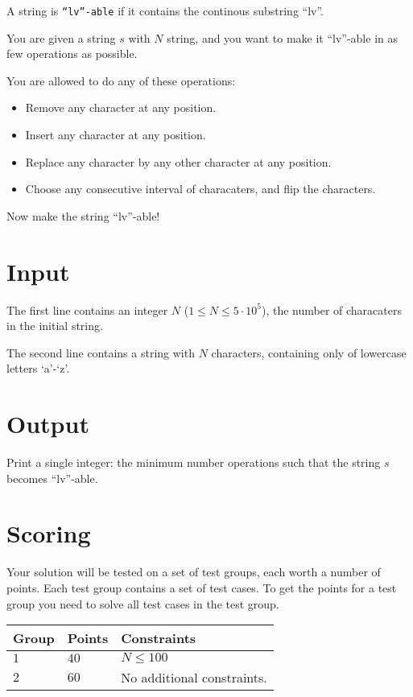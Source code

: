 \noindent
A string is \texttt{``lv''-able} if it contains the continous substring ``lv''.

You are given a string $s$ with $N$ string, and you want to make it ``lv''-able in as few operations as possible.

You are allowed to do any of these operations:
\begin{itemize}
  \item Remove any character at any position.
  \item Insert any character at any position.
  \item Replace any character by any other character at any position.
  \item Choose any consecutive interval of characaters, and flip the characters.
\end{itemize}

Now make the string ``lv''-able!

\section*{Input}
The first line contains an integer $N$ ($1 \leq N \leq 5 \cdot 10^5$), the number of characaters in the initial string.

The second line contains a string with $N$ characters, containing only of lowercase letters `a'-`z'.

\section*{Output}
Print a single integer: the minimum number operations such that the string $s$ becomes ``lv''-able.

\section*{Scoring}
Your solution will be tested on a set of test groups, each worth a number of points. Each test group contains
a set of test cases. To get the points for a test group you need to solve all test cases in the test group.

\noindent
\begin{tabular}{| l | l | p{12cm} |}
  \hline
  \textbf{Group} & \textbf{Points} & \textbf{Constraints} \\ \hline
  $1$    & $40$       & $N \leq 100$ \\ \hline
  $2$    & $60$       & No additional constraints. \\ \hline
\end{tabular}
